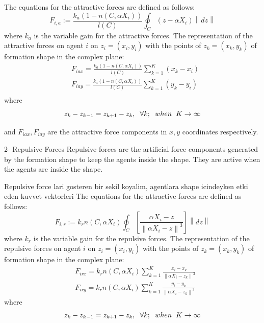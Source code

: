 \documentclass[twoside]{article}
\newcommand{\norm}[1]{\left\lVert#1\right\rVert}
\begin{document}
The equations for the attractive forces are defined as follows:			
			\begin{equation}
F_{i,a} := \frac{k_a (1-n(C,\alpha X_i))}{l(C)} \oint_C(z-\alpha X_i)\norm{dz}
			\end{equation}
			where $k_a$ is the variable gain for the attractive forces. The representation of the attractive forces on agent $i$ on $z_i = (x_i, y_i)$ with the points of  $z_k = (x_k,y_k)$ of formation shape in the complex plane:
			\begin{align*}
& F_{iax} =\frac{k_a (1-n(C,\alpha X_i))}{l(C)}  \sum_{k=1}^{K} (x_k  - x_i)\\
& F_{iay} =\frac{k_a (1-n(C,\alpha X_i))}{l(C)}  \sum_{k=1}^{K} (y_k  - y_i)\\
			\end{align*}
			where
		\begin{equation}
		z_k - z_{k-1} = z_{k+1} - z_k, \hspace{0.2cm}  \forall k ;  \hspace{0.2cm} when  \hspace{0.2cm} K \to\infty
		\end{equation}
			
			and $F_{iax} , F_{iay} $ are the attractive force components in $x,y$ coordinates respectively.
			
			2- Repulsive Forces
			Repulsive forces are the artificial force components generated by the formation shape to keep the agents inside the shape. They are active when the agents are inside the shape. 
					
						Repulsive force lari gosteren bir sekil koyalim, agentlara shape icindeyken etki eden kuvvet vektorleri
			The equations for the attractive forces are defined as follows:	
				\begin{equation}
F_{i,r} := k_r  n(C,\alpha X_i) \oint_C \left[\frac{\alpha X_i - z}{\norm{\alpha X_i - z}^3}\right] \norm{dz}
				\end{equation}
			where $k_r$ is the variable gain for the repulsive forces. The representation of the repulsive forces on agent $i$ on $z_i = (x_i, y_i)$ with the points of  $z_k = (x_k,y_k)$ of formation shape in the complex plane:
				\begin{align*}
				& F_{irx} = k_r n(C,\alpha X_i)  \sum_{k=1}^{K} \frac{x_i - x_k}{\norm{\alpha X_i - z_k}^3}\\
				& F_{iry} = k_r n(C,\alpha X_i)  \sum_{k=1}^{K} \frac{y_i - y_k}{\norm{\alpha X_i - z_k}^3}
				\end{align*}
						where
						\begin{equation}
						z_k - z_{k-1} = z_{k+1} - z_k, \hspace{0.2cm}  \forall k ;  \hspace{0.2cm} when  \hspace{0.2cm} K \to\infty
						\end{equation}
						
\end{document}
